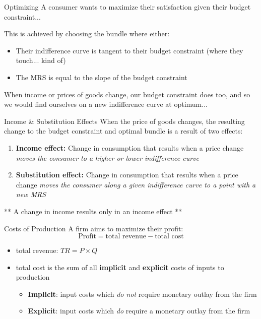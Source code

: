 \documentclass[compress]{beamer}
\begin{document}
\begin{frame}{Optimizing}
A consumer wants to maximize their satisfaction given their budget constraint... 

\begin{block}{This is achieved by choosing the bundle where either:}
    \begin{itemize}
        \item Their indifference curve is tangent to their budget constraint (where they touch... kind of)
        \item The MRS is equal to the slope of the budget constraint
    \end{itemize}
\end{block}

When income or prices of goods change, our budget constraint does too, and so we would find ourselves on a new indifference curve at optimum... 
\end{frame}

\begin{frame}{Income \& Substitution Effects}
    When the price of goods changes, the resulting change to the budget constraint and optimal bundle is a result of two effects:
    \begin{enumerate}
        \item \textbf{Income effect:} Change in consumption that results when a price change \textit{moves the consumer to a higher or lower indifference curve}
        \item \textbf{Substitution effect:} Change in consumption that results when a price change \textit{moves the consumer along a given indifference curve to a point with a new MRS}
    \end{enumerate}

    \vspace{4mm}

\begin{center}
    ** A change in income results only in an income effect **
    \end{center}
\end{frame}

\begin{frame}{Costs of Production}
    A firm aims to maximize their profit:
    \[\text{Profit} = \text{total revenue} - \text{total cost}\]
\begin{itemize}
    \item total revenue: \(TR = P \times Q\)
    \item total cost is the sum of all \textbf{implicit} and \textbf{explicit} costs of inputs to production
    \begin{itemize}
        \item \textbf{Implicit}: input costs which \textit{do not} require monetary outlay from the firm
        \item  \textbf{Explicit}: input costs which \textit{do} require a monetary outlay from the firm
    \end{itemize}
\end{itemize}
\end{frame}
\end{document}
